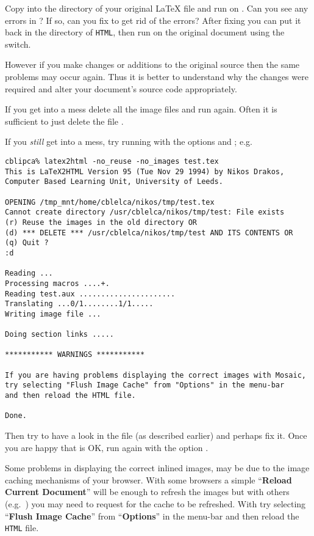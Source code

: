 \begin{htmllist}
Copy  into the directory 
of your original \LaTeX{} file and run  on .
Can you see any errors in ?
If so, can you fix  to get rid of the errors? 
After fixing 
you can put it back in the directory of \texttt{HTML},
then run \latextohtml{} on the original document 
using the  switch. 

However if you make changes or additions to the original source
then the same problems may occur again. 
Thus it is better to understand why the changes were required 
and alter your document's source code appropriately.

\medskip

If you get into a mess delete all the image files and run \latextohtml{}
again. Often it is sufficient to just delete the file .

If you \emph{still} get into a mess, try running \latextohtml{} with the options
 and ; e.g.
\begin{small}
\begin{verbatim}
cblipca% latex2html -no_reuse -no_images test.tex
This is LaTeX2HTML Version 95 (Tue Nov 29 1994) by Nikos Drakos, 
Computer Based Learning Unit, University of Leeds.

OPENING /tmp_mnt/home/cblelca/nikos/tmp/test.tex 
Cannot create directory /usr/cblelca/nikos/tmp/test: File exists
(r) Reuse the images in the old directory OR
(d) *** DELETE *** /usr/cblelca/nikos/tmp/test AND ITS CONTENTS OR
(q) Quit ?
:d

Reading ...
Processing macros ....+.
Reading test.aux ......................
Translating ...0/1........1/1.....
Writing image file ...

Doing section links .....

*********** WARNINGS ***********

If you are having problems displaying the correct images with Mosaic,
try selecting "Flush Image Cache" from "Options" in the menu-bar 
and then reload the HTML file.

Done.
\end{verbatim}
\end{small}
Then try to have a look in the file   
(as described earlier) and perhaps fix it.
Once you are happy that  is OK, run \latextohtml{}
again with the option .

Some problems in displaying the correct inlined images,
may be due to the image caching mechanisms of your browser.
With some browsers a simple ``\textbf{Reload Current Document}'' will be enough
to refresh the images but with others (e.g.\ ) you may need
to request for the cache to be refreshed. With  try 
selecting ``\textbf{Flush Image Cache}'' from ``\textbf{Options}'' in the menu-bar 
and then reload the \texttt{HTML} file.



\end{htmllist}
